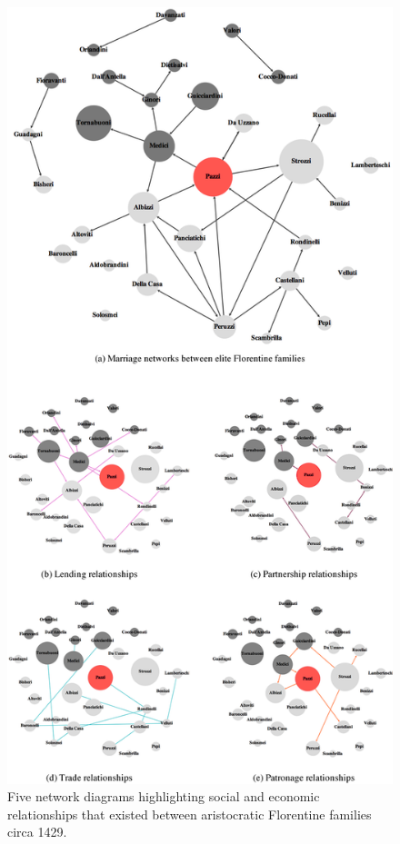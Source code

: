 \begin{figure}[h!]
\centering
\includegraphics[width=\textwidth,height=0.9\textheight,keepaspectratio]{Images/allnetworks.png}
\caption[Social and economic relationships between aristocratic Florentine families]{Five network diagrams highlighting social and economic relationships that existed between aristocratic Florentine families circa 1429.}
\label{florentinenets}
\end{figure}

